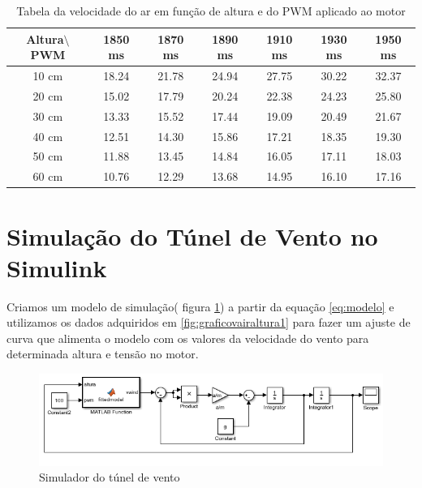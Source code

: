 \begin{table}[htb]
	\centering
\begin{tabular}{|c|c|c|c|c|c|c|}
	\hline 
	Altura$\setminus$PWM & 1850 ms & 1870 ms & 1890 ms & 1910 ms & 1930 ms & 1950 ms \\ 
	\hline 
	10 cm & 18.24 & 21.78 & 24.94 & 27.75 & 30.22 & 32.37 \\ 
	\hline 
	20 cm & 15.02 & 17.79 & 20.24 & 22.38 & 24.23 & 25.80 \\ 
	\hline 
	30 cm & 13.33 & 15.52 & 17.44 & 19.09 & 20.49 & 21.67 \\ 
	\hline 
	40 cm & 12.51 & 14.30 & 15.86 & 17.21 & 18.35 & 19.30 \\ 
	\hline 
	50 cm & 11.88 & 13.45 & 14.84 & 16.05 & 17.11 & 18.03 \\ 
	\hline 
	60 cm & 10.76 & 12.29 & 13.68 & 14.95 & 16.10 & 17.16 \\ 
	\hline 
\end{tabular} 
\caption{Tabela da velocidade do ar em função de altura e do PWM aplicado ao motor}
\label{tb:varxalturapwm}
\end{table}

\section{Simulação do Túnel de Vento no Simulink}

Criamos um modelo de simulação( figura \ref{fig:simulador}) a partir da equação \ref{eq:modelo} e utilizamos os dados adquiridos em \ref{fig:graficovairaltura1} para fazer um ajuste de curva que alimenta o modelo com os valores da velocidade do vento para determinada altura e tensão no motor.

\begin{figure}[htb]
	\centering
	\includegraphics[width=1\linewidth]{simulador}
	\caption[Simulador do túnel de vento]{Simulador do túnel de vento}
	\label{fig:simulador}
\end{figure}

